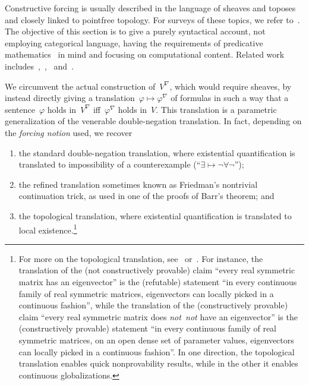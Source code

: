 \documentclass[com,11pt,crcready]{iosart2x}
\theoremstyle{definition}
\theoremstyle{plain}
\theoremstyle{remark}
\newcommand{\?}{\,{:}\,}
\renewcommand{\_}{\mathpunct{.}\,}
\begin{document}
Constructive forcing is usually described in the language of sheaves and
toposes~\cite{palmgren:css,grayson:forcing,streicher:forcing,yamamoto:forcing,scedrov:forcing,tierney:forcing,blass-scedrov:forcing,roberts:class-forcing}
and closely linked to pointfree topology. For surveys of these topics, we
refer to~\cite{blechschmidt:generalized-spaces,johnstone:art,johnstone:point,vickers:continuity,vickers:locales-toposes,belanger-marquis:pointless,johnstone:baby-elephant}.
The objective of this section is to give a purely syntactical account, not
employing categorical language, having the requirements of predicative
mathematics~\cite{maietti:au,vickers:sketches,crosilla:predicativity} in mind
and focusing
on computational content. Related work
includes~\cite[Section~2.4]{avigad:forcing},~\cite{coquand:goodman},~\cite[Section~2.3]{renardel-de-lavalette:bi}
and~\cite{sato:forcing}.

We circumvent the actual construction of~$V^\nabla$, which would require sheaves, by
instead directly giving a translation~$\varphi \mapsto \varphi^\nabla$ of
formulas in such a way that a sentence~$\varphi$ holds in~$V^\nabla$
iff~$\varphi^\nabla$ holds in~$V$. This translation is a parametric
generalization of the venerable double-negation translation. In fact, depending
on the \emph{forcing notion} used, we recover
\begin{enumerate}
\item[(1)] the standard double-negation translation, where
existential quantification is translated to impossibility of a counterexample
(``$\exists \mapsto \neg\forall\neg$'');
\item[(2)] the refined translation sometimes known as Friedman's nontrivial
continuation trick, as used in one of the proofs of Barr's theorem; and
\item[(3)] the topological translation, where existential quantification is
translated to local existence.\footnote{For more on the topological
translation, see~\cite[Section~4.3]{blechschmidt:filmat}
or~\cite[Section~2.4]{blechschmidt:generalized-spaces}. For instance, the
translation of the (not constructively provable) claim ``every real symmetric
matrix has an eigenvector'' is the (refutable) statement ``in every continuous
family of real symmetric matrices, eigenvectors can locally picked in a
continuous fashion'', while the translation of the (constructively provable)
claim ``every real symmetric matrix does \emph{not~not} have an eigenvector''
is the (constructively provable) statement ``in every continuous family of real
symmetric matrices, on an open dense set of parameter values, eigenvectors can
locally picked in a continuous fashion''. In one direction, the topological
translation enables quick nonprovability results, while in the other it enables
continuous globalizations.}
\end{enumerate}
\end{document}
